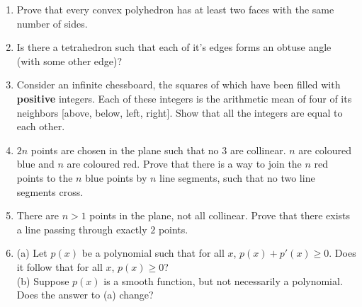 \documentclass{article}
\begin{document}
\begin{enumerate}
	\item{Prove that every convex polyhedron has at least two faces with the same number of sides.}

	\item{Is there a tetrahedron such that each of it's edges forms an obtuse angle (with some other edge)?}

	\item{Consider an infinite chessboard, the squares of which have been filled with \textbf{positive} integers. Each of these integers is the arithmetic mean of four of its neighbors [above, below, left, right]. Show that all the integers are equal to each other.}

	\item{$2n$ points are chosen in the plane such that no $3$ are collinear. $n$ are coloured blue and $n$ are coloured red. Prove that there is a way to join the $n$ red points to the $n$ blue points by $n$ line segments, such that no two line segments cross.}



	\item{There are $n>1$ points in the plane, not all collinear. Prove that there exists a line passing through exactly $2$ points.}

	\item{(a) Let $p(x)$ be a polynomial such that for all $x$, $p(x) + p'(x) \ge 0$. Does it follow that for all $x$, $p(x) \ge 0$?
\\(b) Suppose $p(x)$ is a smooth function, but not necessarily a polynomial. Does the answer to (a) change?}



\end{enumerate}
\end{document}
